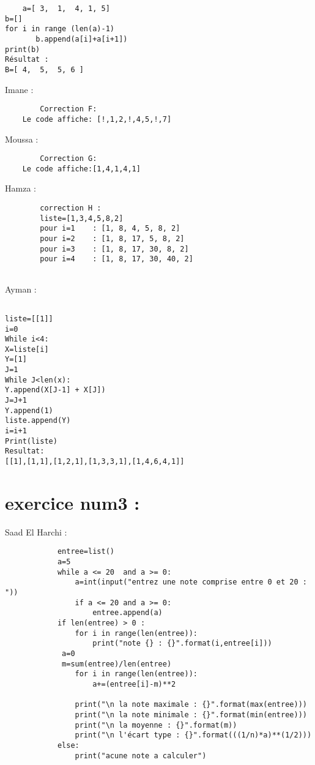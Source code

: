 \documentclass{article}
\begin{document}
	\begin{verbatim}
	a=[ 3,  1,  4, 1, 5]
b=[]
for i in range (len(a)-1)
       b.append(a[i]+a[i+1])
print(b)
Résultat :
B=[ 4,  5,  5, 6 ]
	\end{verbatim}

	\begin{center}
    		Imane :
        \end{center} 
	
	\begin{verbatim}
		Correction F:
	Le code affiche: [!,1,2,!,4,5,!,7]

	\end{verbatim}
	
    	\begin{center}
    		Moussa :
	\end{center} 
	
	\begin{verbatim}
		Correction G:
	Le code affiche:[1,4,1,4,1]
	\end{verbatim}

    	\begin{center}
    		Hamza :
	\end{center} 
	\begin{verbatim}
		correction H :
		liste=[1,3,4,5,8,2]
		pour i=1    : [1, 8, 4, 5, 8, 2]
		pour i=2    : [1, 8, 17, 5, 8, 2]
		pour i=3    : [1, 8, 17, 30, 8, 2]
		pour i=4    : [1, 8, 17, 30, 40, 2]
		
	\end{verbatim}

	\begin{center}
    		Ayman :
	\end{center} 
	\begin{verbatim}
	
liste=[[1]]
i=0
While i<4:
X=liste[i]
Y=[1]
J=1
While J<len(x):
Y.append(X[J-1] + X[J])
J=J+1
Y.append(1)
liste.append(Y)
i=i+1
Print(liste)
Resultat:
[[1],[1,1],[1,2,1],[1,3,3,1],[1,4,6,4,1]]
\end{verbatim}
\section{exercice num3 :}
        \begin{center}
    		Saad El Harchi :
	\end{center}    	  
        	
    	\begin{lstlisting}
			entree=list()
			a=5
			while a <= 20  and a >= 0:
    			a=int(input("entrez une note comprise entre 0 et 20 : "))
    			if a <= 20 and a >= 0:
        			entree.append(a) 
			if len(entree) > 0 :
    			for i in range(len(entree)):
        			print("note {} : {}".format(i,entree[i]))
   			 a=0
   			 m=sum(entree)/len(entree)
    			for i in range(len(entree)):
        			a+=(entree[i]-m)**2
    
    			print("\n la note maximale : {}".format(max(entree)))
    			print("\n la note minimale : {}".format(min(entree)))
    			print("\n la moyenne : {}".format(m))
    			print("\n l'écart type : {}".format(((1/n)*a)**(1/2)))
			else:
    			print("acune note a calculer")
		\end{lstlisting}
\end{document}
